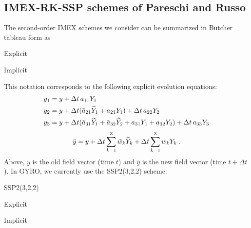 \subsection{IMEX-RK-SSP schemes of Pareschi and Russo}

The second-order IMEX schemes we consider can be summarized in Butcher 
tableau form as
%
\begin{center}
\parbox{.25\linewidth}{
\mbox{Explicit} \par
{}}
\hskip 0.2in
\parbox{.25\linewidth}{
\mbox{Implicit} \par
{}}
\end{center}
%
This notation corresponds to the following explicit evolution equations:
%
\begin{align}
y_1 & = y + {\Delta t} \, a_{11} Y_1 \\
y_2 & = y + {\Delta t} ( {\tilde a}_{21} {\widetilde Y}_1 + a_{21} Y_1 ) 
          + {\Delta t} \, a_{22} Y_2 \\ 
y_3 & = y + {\Delta t} ( {\tilde a}_{31} {\widetilde Y}_1 + {\tilde a}_{32} {\widetilde Y}_2 
                  + a_{31} Y_1 + a_{32} Y_2 ) 
          + {\Delta t} \, a_{33} Y_3 
\end{align}
%
\begin{equation}
{\bar y} = y + {\Delta t} \sum_{k=1}^3 {\tilde w}_k {\widetilde Y}_k 
             + {\Delta t} \sum_{k=1}^3 w_k Y_k \; .
\label{newy}
\end{equation}
%
Above, $y$ is the old field vector (time $t$) and ${\bar y}$ is the new 
field vector (time $t+\Delta t$).  In GYRO, we currently use the SSP2(3,2,2) 
scheme:
%
\begin{center}
SSP2(3,2,2) 
\parbox{.3\linewidth}{
\mbox{Explicit} \par
{}}
\parbox{.3\linewidth}{
\mbox{Implicit} \par
{}}
\end{center}
